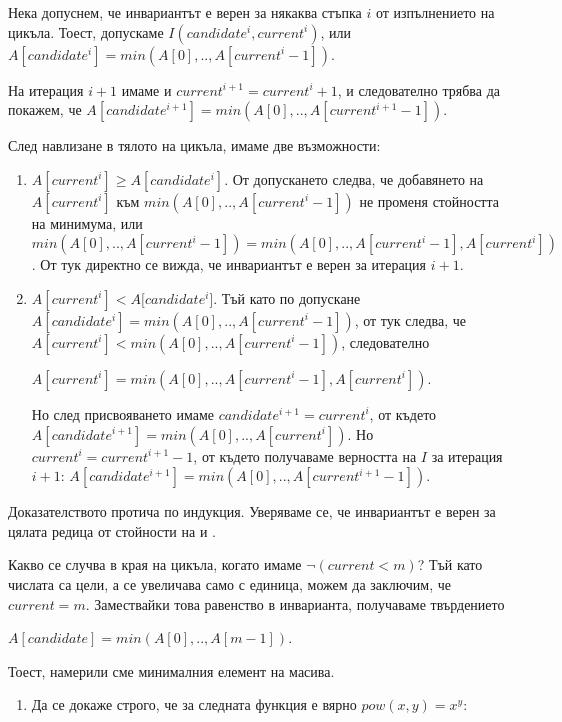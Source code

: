 {\begin{mdframed}[hidealllines=true,backgroundcolor=gray!20]
Нека допуснем, че инвариантът е верен за някаква стъпка $i$ от изпълнението на цикъла. Тоест, допускаме $I(candidate^i, current^i)$, или $A[candidate^i]=min(A[0],..,A[current^i-1])$.

На итерация $i+1$ имаме  и $current^{i+1}=current^{i}+1$, и следователно трябва да покажем, че $A[candidate^{i+1}]=min(A[0],..,A[current^{i+1}-1])$.

След навлизане в тялото на цикъла, имаме две възможности:
\begin{enumerate}[label=\arabic*)]
  \item $A[current^i]\geq A[candidate^i]$. От допускането следва, че добавянето на $A[current^i]$ към $min(A[0],..,A[current^i-1])$ не променя стойността на минимума, или $min(A[0],..,A[current^i-1])=min(A[0],..,A[current^i-1],A[current^i])$. От тук директно се вижда, че инвариантът е верен за итерация $i+1$.
  \item $A[current^i] < A[candidate^i$]. Тъй като по допускане $A[candidate^i] = min(A[0], .., A[current^i-1])$, от тук следва, че $A[current^i] < min(A[0], .., A[current^i-1])$, следователно

   $A[current^i] = min(A[0], .., A[current^i-1], A[current^i])$.

   Но след присвояването имаме $candidate^{i+1} = current^i$, от където $A[candidate^{i+1}] = min(A[0],..,A[current^i])$. Но $current^i = current^{i+1}-1$, от където получаваме верността на $I$ за итерация $i+1$: $A[candidate^{i+1}] = min(A[0], .., A[current^{i+1}-1])$.

\end{enumerate}
  Доказателството протича по индукция. Уверяваме се, че инвариантът е верен за цялата редица от стойности на  и .

  Какво се случва в края на цикъла, когато имаме $\neg(current<m)$? Тъй като числата са цели, а  се увеличава само с единица, можем да заключим, че $current=m$. Замествайки това равенство в инварианта, получаваме твърдението

  $A[candidate] = min(A[0], .., A[m-1])$.

  Тоест, намерили сме минималния елемент на масива.
\end{mdframed}

\begin{enumerate}[resume]
  \item Да се докаже строго, че за следната функция е вярно $pow(x,y)=x^y$:
  \begin{enumerate}[label=\alph*)]%


\end{enumerate}
\end{enumerate}}
